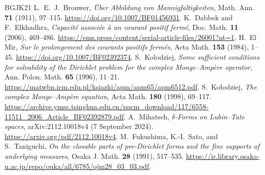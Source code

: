 \documentclass[11pt,a4paper]{article}
\numberwithin{equation}{section}
\theoremstyle{definition}
\theoremstyle{remark}
\begin{document}
\begin{thebibliography}{BGJK21}
L.~E.~J.~Brouwer, \emph{\"Uber Abbildung von Mannigfaltigkeiten},
Math. Ann. \textbf{71} (1911), 97--115.
\url{https://doi.org/10.1007/BF01456931}.
K.~Dabbek and F.~Elkhadhra,
\emph{Capacit\'e associ\'ee \`a un courant positif ferm\'e},
Doc. Math. \textbf{11} (2006), 469--486.
\url{https://ems.press/content/serial-article-files/26001?nt=1}.
H.~El Mir, \emph{Sur le prolongement des courants positifs ferm\'es},
Acta Math. \textbf{153} (1984), 1--45.
\url{https://doi.org/10.1007/BF02392374}.
S.~Ko\l odziej, \emph{Some sufficient conditions for solvability
of the Dirichlet problem for the complex Monge--Amp\`ere operator},
Ann. Polon. Math. \textbf{65} (1996), 11--21.
\url{https://matwbn.icm.edu.pl/ksiazki/apm/apm65/apm6512.pdf}.
S.~Ko\l odziej, \emph{The complex Monge--Amp\`ere equation},
Acta Math. \textbf{180} (1998), 69--117.
\url{https://archive.ymsc.tsinghua.edu.cn/pacm_download/117/6558-11511_2006_Article_BF02392879.pdf}.
A.~Mihatsch, \emph{$\delta$-Forms on Lubin--Tate spaces},
arXiv:2112.10018v4 (7 September 2024).
\url{https://arxiv.org/pdf/2112.10018v4}.
M.~Fukushima, K.-I.~Sato, and S.~Taniguchi,
\emph{On the closable parts of pre-Dirichlet forms and the fine
supports of underlying measures}, Osaka J. Math. \textbf{28}
(1991), 517--535.
\url{https://ir.library.osaka-u.ac.jp/repo/ouka/all/6785/ojm28_03_03.pdf}.

\end{thebibliography}

\end{document}
